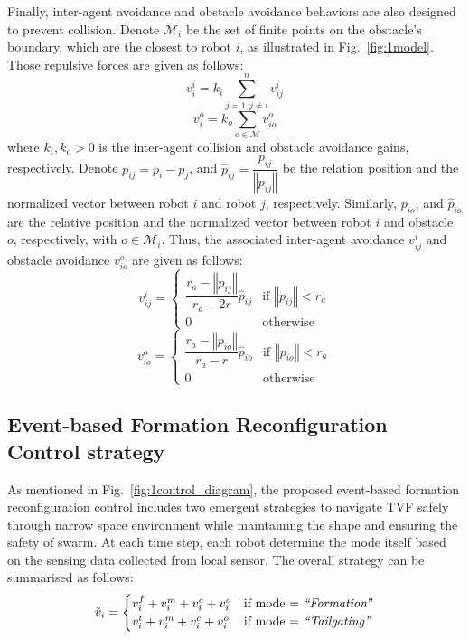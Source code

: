 Finally, inter-agent avoidance and obstacle avoidance behaviors are also designed to prevent collision. Denote $\mathcal{M}_i$ be the set of finite points on the obstacle's boundary, which are the closest to robot $i$, as illustrated in Fig.~\ref{fig:1model}. Those repulsive forces are given as follows:
\begin{equation}
    v_i^i=k_{i}\sum_{j=1,j\neq i}^n{v_{ij}^i}
\end{equation}
\begin{equation}
    v_i^o=k_o\sum_{o\in\mathcal{M}}v_{io}^o
\end{equation}
where $k_i,k_o>0$ is the inter-agent collision and obstacle avoidance gains, respectively. Denote $p_{ij}=p_i-p_j$, and $\hat{p}_{ij}=\dfrac{p_{ij}}{\left\Vert p_{ij}\right\Vert}$ be the relation position and the normalized vector between robot $i$ and robot $j$, respectively. Similarly, $p_{io}$, and $\hat{p}_{io}$ are the relative position and the normalized vector between robot $i$ and obstacle $o$, respectively, with $o\in\mathcal{M}_i$. Thus, the associated inter-agent avoidance $v_{ij}^i$ and obstacle avoidance $v_{io}^o$ are given as follows:
\begin{equation}
    v_{ij}^{i}=\begin{cases}
    \dfrac{r_a-\left\Vert p_{ij}\right\Vert}{r_a -2r}\hat{p}_{ij} & \text{if }\left\Vert p_{ij}\right\Vert<r_{a} \\
    0 & \text{otherwise}
    \end{cases}
    \label{eqn:1ui}
\end{equation}
\begin{equation}
    v_{io}^{o}=\begin{cases}
    \dfrac{r_a-\left\Vert p_{io}\right\Vert}{r_a -r}\hat{p}_{io} & \text{if }\left\Vert p_{io}\right\Vert<r_{a} \\
    0 & \text{otherwise}
    \end{cases}
    \label{eqn:1uo}
\end{equation}

\subsection{Event-based Formation Reconfiguration Control strategy}\label{sec:edc}

As mentioned in Fig.~\ref{fig:1control_diagram}, the proposed event-based formation reconfiguration control includes two emergent strategies to navigate TVF safely through narrow space environment while maintaining the shape and ensuring the safety of swarm. At each time step, each robot determine the mode itself based on the sensing data collected from local sensor. The overall strategy can be summarised as follows:
\begin{equation}
    \tilde{v}_i=\begin{cases}
        v_i^f+v_i^m+v_i^c+v_i^o & \text{if mode = \textit{``Formation''}}\\
        v_i^t+v_i^m+v_i^c+v_i^o & \text{if mode = \textit{``Tailgating''}}
    \end{cases}
    \label{eqn:1v}
\end{equation}

